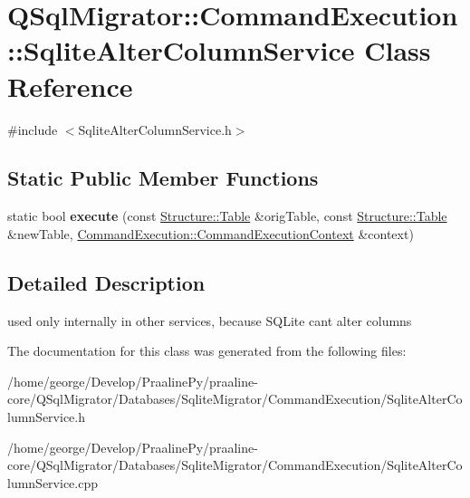 \hypertarget{class_q_sql_migrator_1_1_command_execution_1_1_sqlite_alter_column_service}{}\section{Q\+Sql\+Migrator\+:\+:Command\+Execution\+:\+:Sqlite\+Alter\+Column\+Service Class Reference}
\label{class_q_sql_migrator_1_1_command_execution_1_1_sqlite_alter_column_service}


{\ttfamily \#include $<$Sqlite\+Alter\+Column\+Service.\+h$>$}

\subsection*{Static Public Member Functions}
\begin{DoxyCompactItemize}
\item 
\mbox{\label{class_q_sql_migrator_1_1_command_execution_1_1_sqlite_alter_column_service_a882968bf1a4abc8ccf75d113ebbd7178}} 
static bool {\bfseries execute} (const \hyperlink{class_q_sql_migrator_1_1_structure_1_1_table}{Structure\+::\+Table} \&orig\+Table, const \hyperlink{class_q_sql_migrator_1_1_structure_1_1_table}{Structure\+::\+Table} \&new\+Table, \hyperlink{class_q_sql_migrator_1_1_command_execution_1_1_command_execution_context}{Command\+Execution\+::\+Command\+Execution\+Context} \&context)
\end{DoxyCompactItemize}


\subsection{Detailed Description}
used only internally in other services, because S\+Q\+Lite can\textquotesingle{}t alter columns 

The documentation for this class was generated from the following files\+:\begin{DoxyCompactItemize}
\item 
/home/george/\+Develop/\+Praaline\+Py/praaline-\/core/\+Q\+Sql\+Migrator/\+Databases/\+Sqlite\+Migrator/\+Command\+Execution/Sqlite\+Alter\+Column\+Service.\+h\item 
/home/george/\+Develop/\+Praaline\+Py/praaline-\/core/\+Q\+Sql\+Migrator/\+Databases/\+Sqlite\+Migrator/\+Command\+Execution/Sqlite\+Alter\+Column\+Service.\+cpp\end{DoxyCompactItemize}
